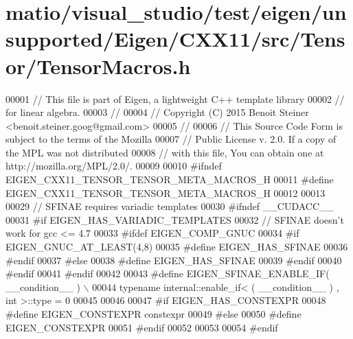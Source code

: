 \hypertarget{matio_2visual__studio_2test_2eigen_2unsupported_2_eigen_2_c_x_x11_2src_2_tensor_2_tensor_macros_8h_source}{}\section{matio/visual\+\_\+studio/test/eigen/unsupported/\+Eigen/\+C\+X\+X11/src/\+Tensor/\+Tensor\+Macros.h}
\label{matio_2visual__studio_2test_2eigen_2unsupported_2_eigen_2_c_x_x11_2src_2_tensor_2_tensor_macros_8h_source}

\begin{DoxyCode}
00001 \textcolor{comment}{// This file is part of Eigen, a lightweight C++ template library}
00002 \textcolor{comment}{// for linear algebra.}
00003 \textcolor{comment}{//}
00004 \textcolor{comment}{// Copyright (C) 2015 Benoit Steiner <benoit.steiner.goog@gmail.com>}
00005 \textcolor{comment}{//}
00006 \textcolor{comment}{// This Source Code Form is subject to the terms of the Mozilla}
00007 \textcolor{comment}{// Public License v. 2.0. If a copy of the MPL was not distributed}
00008 \textcolor{comment}{// with this file, You can obtain one at http://mozilla.org/MPL/2.0/.}
00009 
00010 \textcolor{preprocessor}{#ifndef EIGEN\_CXX11\_TENSOR\_TENSOR\_META\_MACROS\_H}
00011 \textcolor{preprocessor}{#define EIGEN\_CXX11\_TENSOR\_TENSOR\_META\_MACROS\_H}
00012 
00013 
00029 \textcolor{comment}{// SFINAE requires variadic templates}
00030 \textcolor{preprocessor}{#ifndef \_\_CUDACC\_\_}
00031 \textcolor{preprocessor}{#if EIGEN\_HAS\_VARIADIC\_TEMPLATES}
00032   \textcolor{comment}{// SFINAE doesn't work for gcc <= 4.7}
00033 \textcolor{preprocessor}{  #ifdef EIGEN\_COMP\_GNUC}
00034 \textcolor{preprocessor}{    #if EIGEN\_GNUC\_AT\_LEAST(4,8)}
00035 \textcolor{preprocessor}{      #define EIGEN\_HAS\_SFINAE}
00036 \textcolor{preprocessor}{    #endif}
00037 \textcolor{preprocessor}{  #else}
00038 \textcolor{preprocessor}{    #define EIGEN\_HAS\_SFINAE}
00039 \textcolor{preprocessor}{  #endif}
00040 \textcolor{preprocessor}{#endif}
00041 \textcolor{preprocessor}{#endif}
00042 
00043 \textcolor{preprocessor}{#define EIGEN\_SFINAE\_ENABLE\_IF( \_\_condition\_\_ ) \(\backslash\)}
00044 \textcolor{preprocessor}{    typename internal::enable\_if< ( \_\_condition\_\_ ) , int >::type = 0}
00045 
00046 
00047 \textcolor{preprocessor}{#if EIGEN\_HAS\_CONSTEXPR}
00048 \textcolor{preprocessor}{#define EIGEN\_CONSTEXPR constexpr}
00049 \textcolor{preprocessor}{#else}
00050 \textcolor{preprocessor}{#define EIGEN\_CONSTEXPR}
00051 \textcolor{preprocessor}{#endif}
00052 
00053 
00054 \textcolor{preprocessor}{#endif}
\end{DoxyCode}
